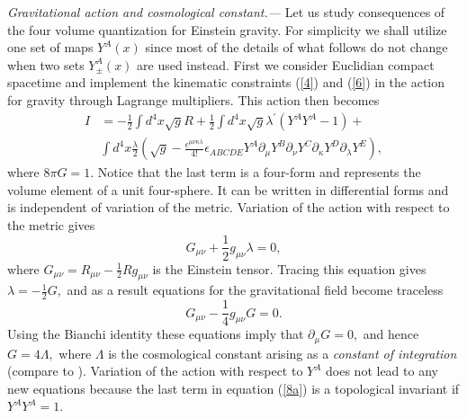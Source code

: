 \documentclass
[twocolumn,prl,unsortedaddress,superscriptaddress,showpacs]{revtex4}%
\begin{document}
\emph{Gravitational action and cosmological constant.---}
Let us study consequences of the four volume quantization for Einstein
gravity. For simplicity we shall utilize one set of maps $Y^{A}\left(
x\right)  $ since most of the details of what follows do not change when two
sets $Y_{\pm}^{A}\left(  x\right)  $ are used instead. First we consider
Euclidian compact spacetime and implement the kinematic constraints (\ref{4})
and (\ref{6}) in the action for gravity through Lagrange multipliers. This
action then becomes
\begin{align}
I  &  =-\frac{1}{2}%
{\displaystyle\int}
d^{4}x\sqrt{g}R+\frac{1}{2}%
{\displaystyle\int}
d^{4}x\sqrt{g}\lambda^{\prime}\left(  Y^{A}Y^{A}-1\right)  +\nonumber\\
&
{\displaystyle\int}
d^{4}x\frac{\lambda}{2}\left(  \sqrt{g}-\frac{\epsilon^{\mu\nu\kappa\lambda}%
}{4!}\epsilon_{ABCDE}Y^{A}\partial_{\mu}Y^{B}\partial_{\nu}Y^{C}%
\partial_{\kappa}Y^{D}\partial_{\lambda}Y^{E}\right)  , \label{8a}%
\end{align}
where $8\pi G=1.$ Notice that the last term is a four-form and represents the
volume element of a unit four-sphere. It can be written in differential forms
and is independent of variation of the metric. Variation of the action with
respect to the metric gives%
\begin{equation}
G_{\mu\nu}+\frac{1}{2}g_{\mu\nu}\lambda=0, \label{10}%
\end{equation}
where $G_{\mu\nu}=R_{\mu\nu}-\frac{1}{2}Rg_{\mu\nu}$ is the Einstein tensor.
Tracing this equation gives $\lambda=-\frac{1}{2}G,$ and as a result equations
for the gravitational field become traceless
\begin{equation}
G_{\mu\nu}-\frac{1}{4}g_{\mu\nu}G=0. \label{12}%
\end{equation}
Using the Bianchi identity these equations imply that $\partial_{\mu}G=0,$ and
hence $G=4\Lambda,$ where $\Lambda$ is the cosmological constant arising as a
\textit{constant of integration }(compare to \cite{HT}). Variation of the
action with respect to $Y^{A}$ does not lead to any new equations because the
last term in equation (\ref{8a}) is a topological invariant if $Y^{A}Y^{A}=1.$
\end{document}
